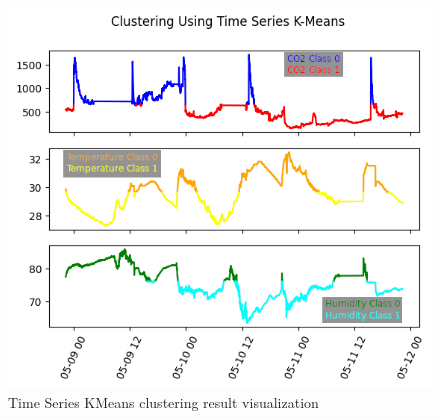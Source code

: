 \begin{figure}
      \centerline{\includegraphics[scale=0.65]{resources/iot-clustering.png}}
      \caption{Time Series KMeans clustering result visualization}
      \label{kmeans}
\end{figure}
